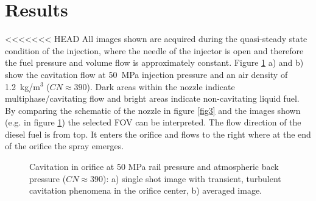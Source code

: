 \documentclass[letterpaper,twocolumn,10pt]{ilass}
\begin{document}
\section*{Results}

<<<<<<< HEAD
All images shown are acquired during the quasi-steady state condition of the injection,
where the needle of the injector is open and therefore the fuel pressure and volume flow
is approximately constant. Figure \ref{fig4} a) and b) show the cavitation flow at 50~MPa
injection pressure and an air density of 1.2~kg/m$^3$ ($CN \approx 390$). Dark areas
within the nozzle indicate multiphase/cavitating flow and bright areas indicate
non-cavitating liquid fuel.
%
By comparing the schematic of the nozzle in figure \ref{fig3} and the images shown
(e.g. in figure \ref{fig4}) the selected FOV can be interpreted. The flow direction of the
diesel fuel is from top. It enters the orifice and flows to the right where at the end of the
orifice the spray emerges.


\begin{figure}[h]
\begin{center}
\end{center}
\vspace*{-10mm}
\caption{Cavitation in orifice at 50 MPa rail pressure and atmospheric back pressure
         ($CN \approx 390$): a) single shot image with transient, turbulent cavitation
				 phenomena in the orifice center, b) averaged image.}
\label{fig4} 
\end{figure}
\end{document}
